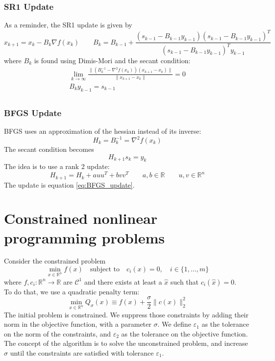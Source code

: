 \documentclass[12pt, openany]{report}
\newcommand{\R}{\mathbb{R}}
\newcommand{\C}{\mathcal{C}}
\theoremstyle{definition}
\begin{document}
\subsubsection{SR1 Update}
As a reminder, the SR1 update is given by
\begin{equation}
	x_{k+1} = x_k - B_k\nabla f(x_k) \qquad B_k = B_{k-1} + \frac{\left(s_{k-1}-B_{k-1} y_{k-1}\right)\left(s_{k-1}-B_{k-1} y_{k-1}\right)^T}{\left(s_{k-1} - B_{k-1} y_{k-1}\right)^T y_{k-1}}
\end{equation}
where $B_k$ is found using Dimis-Mori and the secant condition:
\begin{equation}
	\begin{aligned}
		\lim_{k\to \infty} \frac{\|\left(B_k^{-1}-\nabla^2f(x_k)\right)(x_{k+1}-x_k)\|}{\|x_{k+1}-x_k\|} = 0\\
		B_k y_{k-1} = s_{k-1}\\
	\end{aligned}
\end{equation}
\subsubsection{BFGS Update}
BFGS uses an approximation of the hessian instead of its inverse:
\begin{equation}
	H_k = B_k^{-1} = \nabla^2 f(x_k)
\end{equation}
The secant condition becomes 
\begin{equation}
	H_{k+1}s_k = y_k
\end{equation}
The idea is to use a rank 2 update:
\begin{equation}
	H_{k+1} = H_k + auu^T + bvv^T \qquad a,b\in \R \qquad u,v\in \R^n 
\end{equation}
The update is equation \eqref{eq:BFGS_update}.
\section{Constrained nonlinear programming problems}
Consider the constrained problem 
\begin{equation}
	\min_{x \in \R^n} f(x) \quad \text{subject to} \quad c_i(x) = 0, \quad i \in \{1,\dots,m\}	
\end{equation}
where $f,c_i : \R^n \to \R$ are $\C^1$ and there exists at least a $\hat{x}$ such that $c_i(\hat{x}) = 0$.\\
To do that, we use a quadratic penalty term:
\begin{equation}
	\min_{x \in \R^n} Q_{\sigma} (x) \equiv f(x) + \frac{\sigma}{2} \|c(x)\|_2^2
\end{equation}
The initial problem is constrained. We suppress those constraints by adding their norm in the objective function, with a parameter $\sigma$. We define $\varepsilon_1$ as the tolerance on the norm of the constraints, and $\varepsilon_2$ as the tolerance on the objective function. The concept of the algorithm is to solve the unconstrained problem, and increase $\sigma$ until the constraints are satisfied with tolerance $\varepsilon_1$. 
\end{document}

